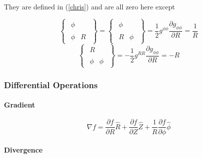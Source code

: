 They are defined in (\ref{chris}) and are all zero here except

\begin{equation*}
\left\{ 
\begin{array}{l}
\begin{array}{ll}
\phi & \ 
\end{array}
\\ 
\begin{array}{ll}
\phi & R%
\end{array}%
\end{array}%
\right\} =\left\{ 
\begin{array}{l}
\begin{array}{ll}
\phi & \ 
\end{array}
\\ 
\begin{array}{ll}
R & \phi%
\end{array}%
\end{array}%
\right\} =\frac{1}{2}g^{\phi \phi }\frac{\partial g_{\phi \phi }}{\partial R}%
=\frac{1}{R}
\end{equation*}%
\begin{equation}
\left\{ 
\begin{array}{l}
\begin{array}{ll}
R & \ 
\end{array}
\\ 
\begin{array}{ll}
\phi & \phi%
\end{array}%
\end{array}%
\right\} =-\frac{1}{2}g^{RR}\frac{\partial g_{\phi \phi }}{\partial R}=-R
\end{equation}

\subsubsection{Differential Operations}

\paragraph{Gradient}

\begin{equation}
\nabla f=\frac{\partial f}{\partial R}\widehat{R}+\frac{\partial f}{\partial
Z}\widehat{Z}+\frac{1}{R}\frac{\partial f}{\partial\phi}\widehat{\phi}
\end{equation}

\paragraph{Divergence}

